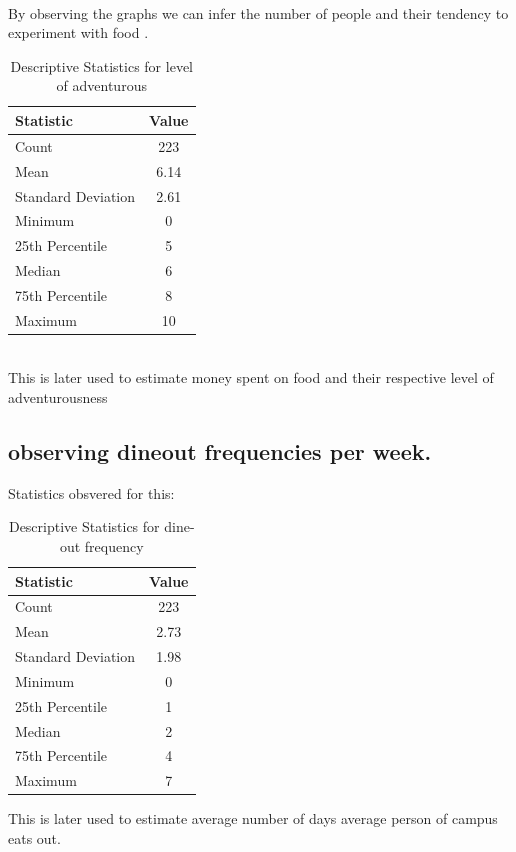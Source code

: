 \documentclass[12pt]{article}
\begin{document}
 \\
 By observing the graphs we can infer the number of people and their tendency to experiment with food .
 \begin{table}[htbp]
  \centering
  \caption{Descriptive Statistics for level of adventurous}
  \label{tab:stats}
  \begin{tabular}{@{}lc@{}}
    \toprule
    \textbf{Statistic} & \textbf{Value} \\
    \midrule
    Count & 223 \\
    Mean & 6.14 \\
    Standard Deviation & 2.61 \\
    Minimum & 0 \\
    25th Percentile & 5 \\
    Median & 6 \\
    75th Percentile & 8 \\
    Maximum & 10 \\
    \bottomrule
  \end{tabular}
\end{table}
 \\This is later used to estimate money spent on food and their respective level of adventurousness 

 \subsection{observing  dineout frequencies per week.}
 Statistics obsvered for this:
 \begin{table}[htbp]
  \centering
  \caption{Descriptive Statistics for dine-out frequency}
  \label{tab:stats}
  \begin{tabular}{@{}lc@{}}
    \toprule
    \textbf{Statistic} & \textbf{Value} \\
    \midrule
    Count & 223 \\
    Mean & 2.73 \\
    Standard Deviation & 1.98 \\
    Minimum & 0 \\
    25th Percentile & 1 \\
    Median & 2 \\
    75th Percentile & 4 \\
    Maximum & 7 \\
    \bottomrule
  \end{tabular}
\end{table}


 This is later used to estimate average number of days average person of campus eats out.
\end{document}
